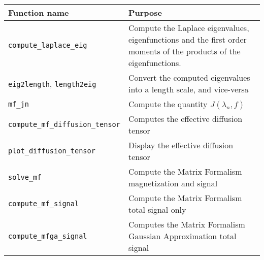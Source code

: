 \begin{tabular}{|l|p{10cm}|} \hline
    Function name                                  & Purpose                                                                                                            \\ \hline
    \verb+compute_laplace_eig+                         & Compute the Laplace eigenvalues, eigenfunctions and the first order moments of the products of the eigenfunctions. \\ \hline
    \verb+eig2length+, \verb+length2eig+ & Convert the computed eigenvalues into a length scale, and vice-versa                                               \\ \hline
    \verb+mf_jn+                         & Compute the quantity $J(\lambda_n,f)$                                                                              \\ \hline
    \verb+compute_mf_diffusion_tensor+                         & Computes the effective diffusion tensor                                                                            \\ \hline
    \verb+plot_diffusion_tensor+                         & Display the effective diffusion tensor                                                                             \\ \hline
    \verb+solve_mf+                         & Compute the Matrix Formalism magnetization and signal                                                              \\ \hline
    \verb+compute_mf_signal+                         & Compute the Matrix Formalism total signal only                                                                     \\ \hline
    \verb+compute_mfga_signal+                        & Computes the Matrix Formalism Gaussian Approximation total signal                                                  \\ \hline
\end{tabular}
